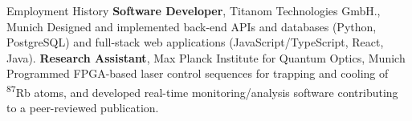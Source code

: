 \begin{rubric}{Employment History}
	\textbf{Software Developer}, Titanom Technologies GmbH., Munich\newline
	Designed and implemented back-end APIs and databases (Python, PostgreSQL) and full-stack web applications (JavaScript/TypeScript, React, Java).
	\textbf{Research Assistant}, Max Planck Institute for Quantum Optics, Munich\newline
	Programmed FPGA-based laser control sequences for trapping and cooling of \textsuperscript{87}Rb atoms, and developed real-time monitoring/analysis software contributing to a peer-reviewed publication.
\end{rubric}




